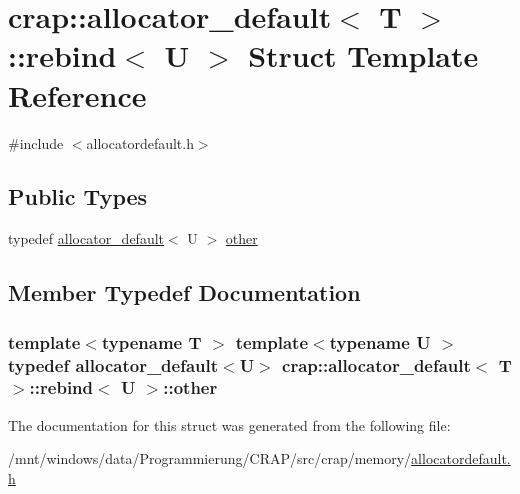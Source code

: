 \hypertarget{structcrap_1_1allocator__default_1_1rebind}{\section{crap\-:\-:allocator\-\_\-default$<$ T $>$\-:\-:rebind$<$ U $>$ Struct Template Reference}
\label{structcrap_1_1allocator__default_1_1rebind}
}


{\ttfamily \#include $<$allocatordefault.\-h$>$}

\subsection*{Public Types}
\begin{DoxyCompactItemize}
\item 
typedef \hyperlink{classcrap_1_1allocator__default}{allocator\-\_\-default}$<$ U $>$ \hyperlink{structcrap_1_1allocator__default_1_1rebind_ae93e48c1c10de1157ac200d48d92edf9}{other}
\end{DoxyCompactItemize}


\subsection{Member Typedef Documentation}
\hypertarget{structcrap_1_1allocator__default_1_1rebind_ae93e48c1c10de1157ac200d48d92edf9}{
\subsubsection[{other}]{\setlength{\rightskip}{0pt plus 5cm}template$<$typename T $>$ template$<$typename U $>$ typedef {\bf allocator\-\_\-default}$<$U$>$ {\bf crap\-::allocator\-\_\-default}$<$ T $>$\-::{\bf rebind}$<$ U $>$\-::{\bf other}}}\label{structcrap_1_1allocator__default_1_1rebind_ae93e48c1c10de1157ac200d48d92edf9}


The documentation for this struct was generated from the following file\-:\begin{DoxyCompactItemize}
\item 
/mnt/windows/data/\-Programmierung/\-C\-R\-A\-P/src/crap/memory/\hyperlink{allocatordefault_8h}{allocatordefault.\-h}\end{DoxyCompactItemize}
